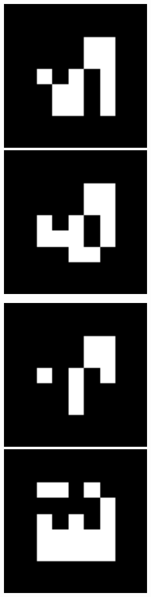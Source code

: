 \documentclass[10pt,letterpaper]{article}
\begin{document}
\includegraphics[width=3in]{MarkerData_109.png}
\includegraphics[width=3in]{MarkerData_110.png}


\includegraphics[width=3in]{MarkerData_111.png}
\includegraphics[width=3in]{MarkerData_112.png}
\end{document}
